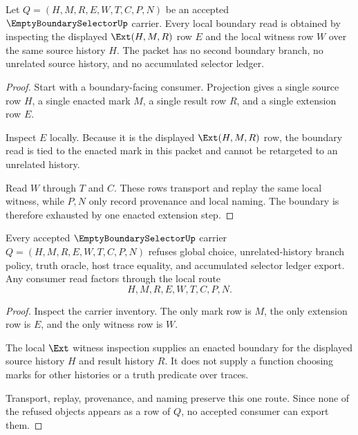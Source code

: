 \begin{theorem}
\label{thm:emptyboundaryselector-boundary-exhaustion}
Let $Q=(H,M,R,E,W,T,C,P,N)$ be an accepted $\EmptyBoundarySelectorUp$ carrier. Every local boundary read is obtained by inspecting the displayed $\Ext(H,M,R)$ row $E$ and the local witness row $W$ over the same source history $H$. The packet has no second boundary branch, no unrelated source history, and no accumulated selector ledger.
\end{theorem}
\begin{proof}
Start with a boundary-facing consumer. Projection gives a single source row $H$, a single enacted mark $M$, a single result row $R$, and a single extension row $E$.

Inspect $E$ locally. Because it is the displayed $\Ext(H,M,R)$ row, the boundary read is tied to the enacted mark in this packet and cannot be retargeted to an unrelated history.

Read $W$ through $T$ and $C$. These rows transport and replay the same local witness, while $P,N$ only record provenance and local naming. The boundary is therefore exhausted by one enacted extension step.
\end{proof}

\begin{theorem}
\label{thm:emptyboundaryselector-nonescape}
Every accepted $\EmptyBoundarySelectorUp$ carrier $Q=(H,M,R,E,W,T,C,P,N)$ refuses global choice, unrelated-history branch policy, truth oracle, host trace equality, and accumulated selector ledger export. Any consumer read factors through the local route
$$
H,M,R,E,W,T,C,P,N.
$$
\end{theorem}
\begin{proof}
Inspect the carrier inventory. The only mark row is $M$, the only extension row is $E$, and the only witness row is $W$.

The local $\Ext$ witness inspection supplies an enacted boundary for the displayed source history $H$ and result history $R$. It does not supply a function choosing marks for other histories or a truth predicate over traces.

Transport, replay, provenance, and naming preserve this one route. Since none of the refused objects appears as a row of $Q$, no accepted consumer can export them.
\end{proof}



